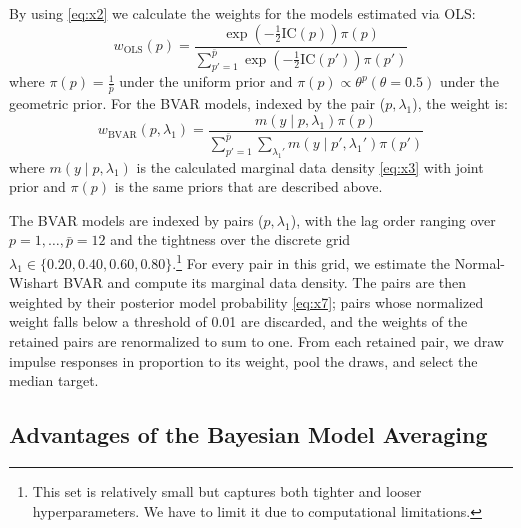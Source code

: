 \documentclass[12pt, a4paper]{article}
\begin{document}
By using \eqref{eq:x2} we calculate the weights for the models estimated via OLS:
\begin{equation} \label{eq:x6}
w_{\text{OLS}}(p) = \frac{\exp \left(-\frac{1}{2} \text{IC}(p)\right) \pi(p)}{\sum_{p'=1}^{\bar{p}} \exp \left(-\frac{1}{2} \text{IC}(p')\right) \pi(p')}
\end{equation}
where $\pi(p) = \frac{1}{\bar p}$ under the uniform prior and $\pi(p) \propto \theta^{p} (\theta = 0.5)$ under the geometric prior. For the BVAR models, indexed by the pair ($p, \lambda_1$), the weight is:
\begin{equation} \label{eq:x7}
w_{\text{BVAR}}(p, \lambda_1) = \frac{m(y \mid p, \lambda_1) \pi(p)}{\sum_{p'=1}^{\bar{p}} \sum_{\lambda_1'} m(y \mid p', \lambda_1') \pi(p')}
\end{equation}
where $m(y \mid p, \lambda_1)$ is the calculated marginal data density \eqref{eq:x3} with joint prior and $\pi(p)$ is the same priors that are described above. 

The BVAR models are indexed by pairs ($p, \lambda_1$), with the lag order ranging over $p = 1, \dots, \bar p=12$ and the tightness over the discrete grid $\lambda_1 \in \{0.20, 0.40, 0.60, 0.80\}$.\footnote{This set is relatively small but captures both tighter and looser hyperparameters. We have to limit it due to computational limitations.} For every pair in this grid, we estimate the Normal-Wishart BVAR and compute its marginal data density. The pairs are then weighted by their posterior model probability \eqref{eq:x7}; pairs whose normalized weight falls below a threshold of 0.01 are discarded, and the weights of the retained pairs are renormalized to sum to one. From each retained pair, we draw impulse responses in proportion to its weight, pool the draws, and select the median target.

\subsection*{Advantages of the Bayesian Model Averaging}
\end{document}
